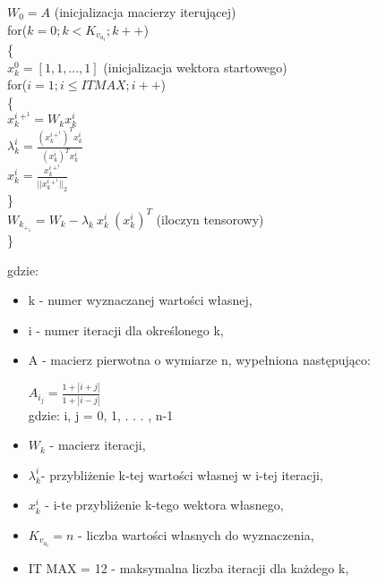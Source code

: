 \documentclass{article}
\begin{document}
\begin{flushleft}

$W_0=A$ 
\hspace{4 cm}(inicjalizacja macierzy iterującej)\\
for($k = 0; k < K_v_a_l; k ++$)\\
\{\\
\hspace{2 mm} 
$x_k^0 = [1,1,...,1]$ 
\hspace{2.5 cm}
(inicjalizacja wektora startowego)\\
\hspace{2 mm}
for($i = 1; i \leq IT MAX; i ++$)\\
\hspace{2 mm}\{\\

\hspace{4 mm}
$x_k^i^+^1 = W_k x_k^i$\\

\hspace{4 mm}
$\lambda_k^i= \frac{(x_k^i^+^1)^T x_k^i}{(x_k^i)^T x_k^i}$\\

\hspace{4 mm}
$x_k^i= 
\frac{x_k^i^+^1}{||x_k^i^+^1||_2}$\\

\hspace{2 mm}\}\\

\hspace{2 mm}
$W_k_+_1 = W_k- 
\lambda_k ~x_k^i ~(x_k^i)^T$
\hspace{0.8 cm}
(iloczyn tensorowy)\\
\}\\
\end{flushleft}
gdzie:
\begin{itemize}
    \item k - numer wyznaczanej wartości własnej,
    \item i - numer iteracji dla określonego k,
    \item A - macierz pierwotna o wymiarze n, wypełniona następująco:
    
    \begin{center}
        $A_i_j = \frac{1+|i+j|}{1+|i-j|}$\\
   gdzie: i, j = 0, 1, . . . , n-1
    \end{center}
    
    \item $W_k$ - macierz iteracji,
    \item $\lambda_k^i$- przybliżenie k-tej wartości własnej w i-tej iteracji,
    \item $x_k^i$ - i-te przybliżenie k-tego wektora własnego,
    \item $K_v_a_l=n$ - liczba wartości własnych do wyznaczenia,
    \item IT MAX = 12  - maksymalna liczba iteracji dla każdego k,
\end{itemize}
\end{document}
